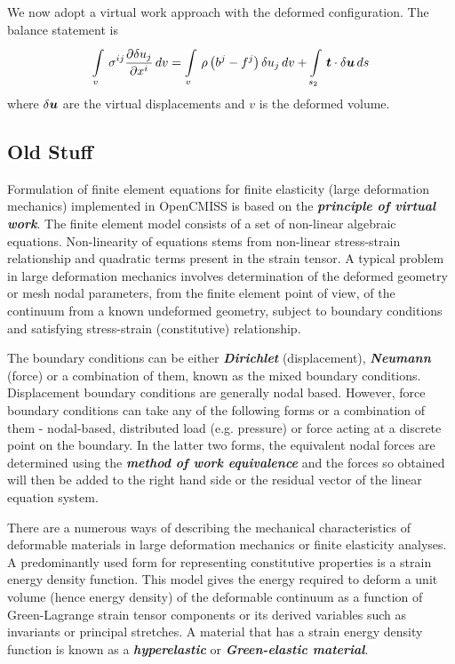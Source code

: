 We now adopt a virtual work approach with the deformed configuration. The
balance statement is
\begin{equation}
    \displaystyle\int\limits_{v}^{} \,\sigma^{ij} \dfrac{\partial \delta
      u_{j}}{\partial x^{i}} \,dv =  \displaystyle\int\limits_{v}^{} \,\rho\left( b^{j}-f^{j} \right)\delta
    u_{j}\,dv +  \displaystyle\int\limits_{s_{2}}^{} \,\boldsymbol{t}\cdot\delta\boldsymbol{u}\,ds 
\end{equation}
where $\delta\boldsymbol{u}$ are the virtual displacements and $v$ is the deformed
volume.

\subsection{Old Stuff}

Formulation of finite element equations for finite elasticity (large
deformation mechanics) implemented in OpenCMISS is based on the
\textit{\textbf{principle of virtual work}}. The finite element model consists
of a set of non-linear algebraic equations. Non-linearity of equations stems
from non-linear stress-strain relationship and quadratic terms present in the
strain tensor. A typical problem in large deformation mechanics involves
determination of the deformed geometry or mesh nodal parameters, from the
finite element point of view, of the continuum from a known undeformed
geometry, subject to boundary conditions and satisfying stress-strain
(constitutive) relationship.
  
The boundary conditions can be either \textit{\textbf{Dirichlet}}
(displacement), \textit{\textbf{Neumann}} (force) or a combination of them,
known as the mixed boundary conditions. Displacement boundary conditions are
generally nodal based. However, force boundary conditions can take any of the
following forms or a combination of them - nodal-based, distributed load
(e.g. pressure) or force acting at a discrete point on the boundary. In the
latter two forms, the equivalent nodal forces are determined using the
\textit{\textbf{method of work equivalence}} \cite{hutton:2004} and the forces
so obtained will then be added to the right hand side or the residual vector
of the linear equation system.

There are a numerous ways of describing the mechanical characteristics of
deformable materials in large deformation mechanics or finite elasticity
analyses. A predominantly used form for representing constitutive properties
is a strain energy density function. This model gives the energy required to
deform a unit volume (hence energy density) of the deformable continuum as a
function of Green-Lagrange strain tensor components or its derived variables
such as invariants or principal stretches. A material that has a strain energy
density function is known as a \textit{\textbf{hyperelastic}} or
\textit{\textbf{Green-elastic material}}.

